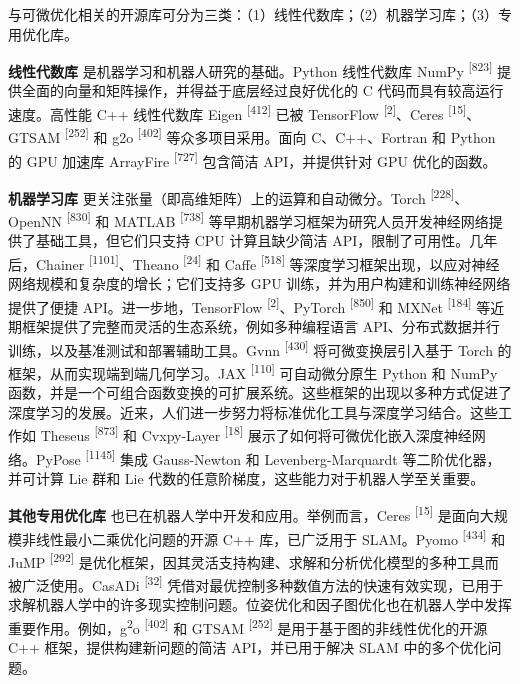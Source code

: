 与可微优化相关的开源库可分为三类：（1）线性代数库；（2）机器学习库；（3）专用优化库。

\textbf{线性代数库} 是机器学习和机器人研究的基础。Python 线性代数库 NumPy \textsuperscript{[823]} 提供全面的向量和矩阵操作，并得益于底层经过良好优化的 C 代码而具有较高运行速度。高性能 C++ 线性代数库 Eigen \textsuperscript{[412]} 已被 TensorFlow \textsuperscript{[2]}、Ceres \textsuperscript{[15]}、GTSAM \textsuperscript{[252]} 和 g2o \textsuperscript{[402]} 等众多项目采用。面向 C、C++、Fortran 和 Python 的 GPU 加速库 ArrayFire \textsuperscript{[727]} 包含简洁 API，并提供针对 GPU 优化的函数。

\textbf{机器学习库} 更关注张量（即高维矩阵）上的运算和自动微分。Torch \textsuperscript{[228]}、OpenNN \textsuperscript{[830]} 和 MATLAB \textsuperscript{[738]} 等早期机器学习框架为研究人员开发神经网络提供了基础工具，但它们只支持 CPU 计算且缺少简洁 API，限制了可用性。几年后，Chainer \textsuperscript{[1101]}、Theano \textsuperscript{[24]} 和 Caffe \textsuperscript{[518]} 等深度学习框架出现，以应对神经网络规模和复杂度的增长；它们支持多 GPU 训练，并为用户构建和训练神经网络提供了便捷 API。进一步地，TensorFlow \textsuperscript{[2]}、PyTorch \textsuperscript{[850]} 和 MXNet \textsuperscript{[184]} 等近期框架提供了完整而灵活的生态系统，例如多种编程语言 API、分布式数据并行训练，以及基准测试和部署辅助工具。Gvnn \textsuperscript{[430]} 将可微变换层引入基于 Torch 的框架，从而实现端到端几何学习。JAX \textsuperscript{[110]} 可自动微分原生 Python 和 NumPy 函数，并是一个可组合函数变换的可扩展系统。这些框架的出现以多种方式促进了深度学习的发展。近来，人们进一步努力将标准优化工具与深度学习结合。这些工作如 Theseus \textsuperscript{[873]} 和 Cvxpy-Layer \textsuperscript{[18]} 展示了如何将可微优化嵌入深度神经网络。PyPose \textsuperscript{[1145]} 集成 Gauss-Newton 和 Levenberg-Marquardt 等二阶优化器，并可计算 Lie 群和 Lie 代数的任意阶梯度，这些能力对于机器人学至关重要。

\textbf{其他专用优化库} 也已在机器人学中开发和应用。举例而言，Ceres \textsuperscript{[15]} 是面向大规模非线性最小二乘优化问题的开源 C++ 库，已广泛用于 SLAM。Pyomo \textsuperscript{[434]} 和 JuMP \textsuperscript{[292]} 是优化框架，因其灵活支持构建、求解和分析优化模型的多种工具而被广泛使用。CasADi \textsuperscript{[32]} 凭借对最优控制多种数值方法的快速有效实现，已用于求解机器人学中的许多现实控制问题。位姿优化和因子图优化也在机器人学中发挥重要作用。例如，g\textsuperscript{2}o \textsuperscript{[402]} 和 GTSAM \textsuperscript{[252]} 是用于基于图的非线性优化的开源 C++ 框架，提供构建新问题的简洁 API，并已用于解决 SLAM 中的多个优化问题。

